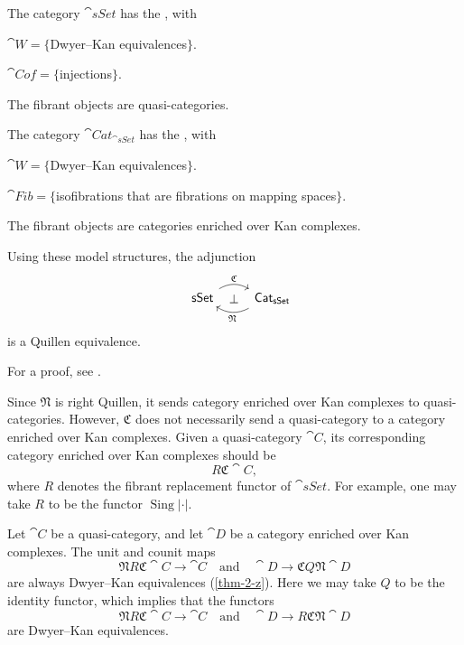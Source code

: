 \begin{theorem}\label{thm-4-e}
    The category $\cat{sSet}$ has the , with 
    \begin{itms}
        \item $\cat W=\{$Dwyer--Kan equivalences$\}$.
        \item $\cat{Cof}=\{$injections$\}$.
        \item The fibrant objects are quasi-categories.
    \end{itms}
    The category $\cat{Cat}_{\cat{sSet}}$ has the , with
    \begin{itms}
        \item $\cat W=\{$Dwyer--Kan equivalences$\}$.
        \item $\cat{Fib}=\{$isofibrations that are fibrations on mapping spaces$\}$.
        \item The fibrant objects are categories enriched over Kan complexes.
    \end{itms}
    Using these model structures, the adjunction
    \[\begin{tikzcd}
        \cat{sSet}\ar[r,bend left,"\mathfrak C"]\ar[r,phantom,"\bot"] &
        \rlap{$\cat{Cat}_{\cat{sSet}}$}\phantom{\cat{sSet}}\ar[l,bend left,"\mathfrak N"]
    \end{tikzcd}\]
    is a Quillen equivalence.
\end{theorem}

For a proof, see \cite[Theorem~2.2.5.1]{htt}.

Since $\mathfrak N$ is right Quillen,
it sends category enriched over Kan complexes to quasi-categories.
However, $\mathfrak C$ does not necessarily
send a quasi-category to a category enriched over Kan complexes.
Given a quasi-category $\cat C$,
its corresponding category enriched over Kan complexes should be 
\[ R\mathfrak C\cat C, \]
where $R$ denotes the fibrant replacement functor of $\cat{sSet}$.
For example, one may take $R$ to be the functor $\operatorname{Sing}|\cdot|$.

Let $\cat C$ be a quasi-category, and let $\cat D$ be a category 
enriched over Kan complexes. The unit and counit maps
\[ \mathfrak NR\mathfrak C\cat C\to\cat C\quad\text{and}\quad\cat D\to\mathfrak CQ\mathfrak N\cat D \]
are always Dwyer--Kan equivalences (\ref{thm-2-z}).
Here we may take $Q$ to be the identity functor, 
which implies that the functors
\[ \mathfrak NR\mathfrak C\cat C\to\cat C\quad\text{and}\quad\cat D\to R\mathfrak C\mathfrak N\cat D \]
are Dwyer--Kan equivalences.

